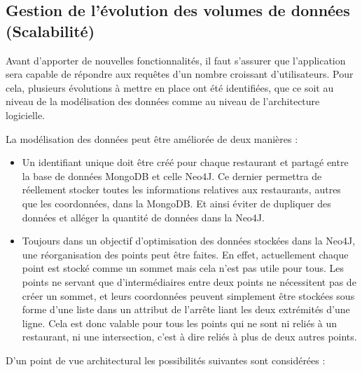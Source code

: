 \documentclass[12pt]{article}
\begin{document}
\subsection{Gestion de l'évolution des volumes de données (Scalabilité)}

    Avant d'apporter de nouvelles fonctionnalités, il faut s'assurer que l'application sera capable de répondre aux requêtes d'un nombre croissant d'utilisateurs. Pour cela, plusieurs évolutions à mettre en place ont été identifiées, que ce soit au niveau de la modélisation des données comme au niveau de l'architecture logicielle.

    La modélisation des données peut être améliorée de deux manières :
    
    \begin{itemize}
        \item Un identifiant unique doit être créé pour chaque restaurant et partagé entre la base de données MongoDB et celle Neo4J. Ce dernier permettra de réellement stocker toutes les informations relatives aux restaurants, autres que les coordonnées, dans la MongoDB. Et ainsi éviter de dupliquer des données et alléger la quantité de données dans la Neo4J.
        \item Toujours dans un objectif d'optimisation des données stockées dans la Neo4J, une réorganisation des points peut être faites. En effet, actuellement chaque point est stocké comme un sommet mais cela n'est pas utile pour tous. Les points ne servant que d'intermédiaires entre deux points ne nécessitent pas de créer un sommet, et leurs coordonnées peuvent simplement être stockées sous forme d'une liste dans un attribut de l'arrête liant les deux extrémités d'une ligne. Cela est donc valable pour tous les points qui ne sont ni reliés à un restaurant, ni une intersection, c'est à dire reliés à plus de deux autres points.
    \end{itemize}

    D'un point de vue architectural les possibilités suivantes sont considérées :
\end{document}
